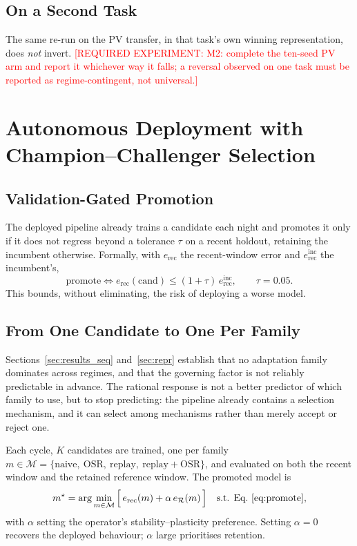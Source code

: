\documentclass[journal]{IEEEtran}
\newcommand{\needexp}[1]{\textcolor{red}{[REQUIRED EXPERIMENT: #1]}}
\begin{document}
\subsection{On a Second Task}
The same re-run on the PV transfer, in that task's own winning representation,
does \emph{not} invert. \needexp{M2: complete the ten-seed PV arm and report it
whichever way it falls; a reversal observed on one task must be reported as
regime-contingent, not universal.}

\section{Autonomous Deployment with Champion--Challenger Selection}
\label{sec:selection}

\subsection{Validation-Gated Promotion}
The deployed pipeline already trains a candidate each night and promotes it only
if it does not regress beyond a tolerance $\tau$ on a recent holdout, retaining
the incumbent otherwise. Formally, with $e_{\mathrm{rec}}$ the recent-window
error and $e^{\mathrm{inc}}_{\mathrm{rec}}$ the incumbent's,
\begin{equation}
\text{promote} \iff e_{\mathrm{rec}}(\text{cand}) \le (1+\tau)\,
e^{\mathrm{inc}}_{\mathrm{rec}} , \qquad \tau = 0.05 .
\label{eq:promote}
\end{equation}
This bounds, without eliminating, the risk of deploying a worse model.

\subsection{From One Candidate to One Per Family}
Sections~\ref{sec:results_seq} and~\ref{sec:repr} establish that no adaptation
family dominates across regimes, and that the governing factor is not reliably
predictable in advance. The rational response is not a better predictor of which
family to use, but to stop predicting: the pipeline already contains a selection
mechanism, and it can select among mechanisms rather than merely accept or
reject one.

Each cycle, $K$ candidates are trained, one per family
$m \in \mathcal{M} = \{\text{naive},\ \text{OSR},\ \text{replay},\
\text{replay}{+}\text{OSR}\}$, and evaluated on both the recent window and the
retained reference window. The promoted model is
\begin{equation}
m^{\star} = \arg\min_{m \in \mathcal{M}}
\Big[\, e_{\mathrm{rec}}(m) + \alpha\, e_{\mathcal{R}}(m) \,\Big]
\quad \text{s.t. Eq.~\eqref{eq:promote}} ,
\label{eq:selection}
\end{equation}
with $\alpha$ setting the operator's stability--plasticity preference. Setting
$\alpha{=}0$ recovers the deployed behaviour; $\alpha$ large prioritises
retention.
\end{document}

